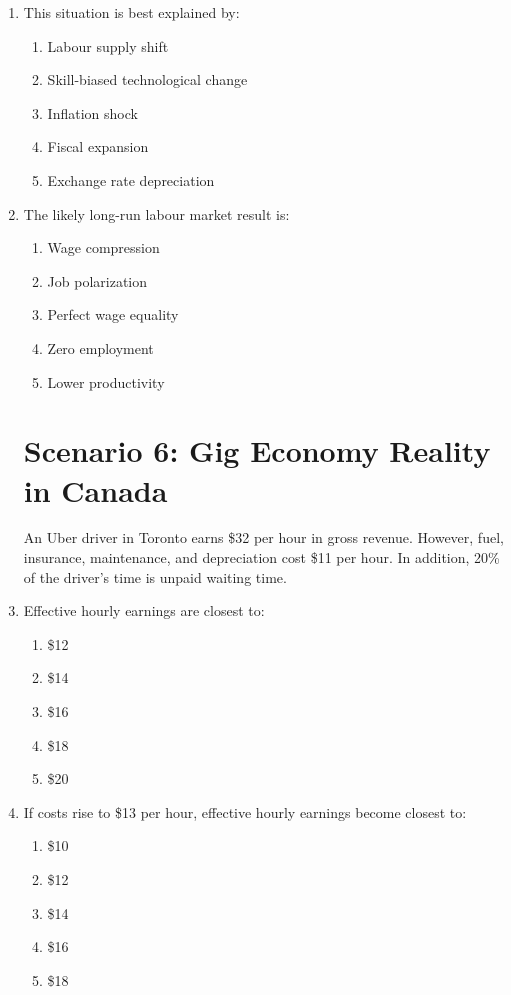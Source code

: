 \documentclass[12pt]{article}
\begin{document}
\begin{enumerate}[label=\textbf{\arabic*.}]
\item This situation is best explained by:
\begin{enumerate}[label=\Alph*.]
\item Labour supply shift
\item Skill-biased technological change
\item Inflation shock
\item Fiscal expansion
\item Exchange rate depreciation
\end{enumerate}

\item The likely long-run labour market result is:
\begin{enumerate}[label=\Alph*.]
\item Wage compression
\item Job polarization
\item Perfect wage equality
\item Zero employment
\item Lower productivity
\end{enumerate}

\section*{Scenario 6: Gig Economy Reality in Canada}

An Uber driver in Toronto earns \$32 per hour in gross revenue. However, fuel, insurance, maintenance, and depreciation cost \$11 per hour. In addition, 20\% of the driver’s time is unpaid waiting time.

\item Effective hourly earnings are closest to:
\begin{enumerate}[label=\Alph*.]
\item \$12
\item \$14
\item \$16
\item \$18
\item \$20
\end{enumerate}

\item If costs rise to \$13 per hour, effective hourly earnings become closest to:
\begin{enumerate}[label=\Alph*.]
\item \$10
\item \$12
\item \$14
\item \$16
\item \$18
\end{enumerate}


\end{enumerate}
\end{document}

